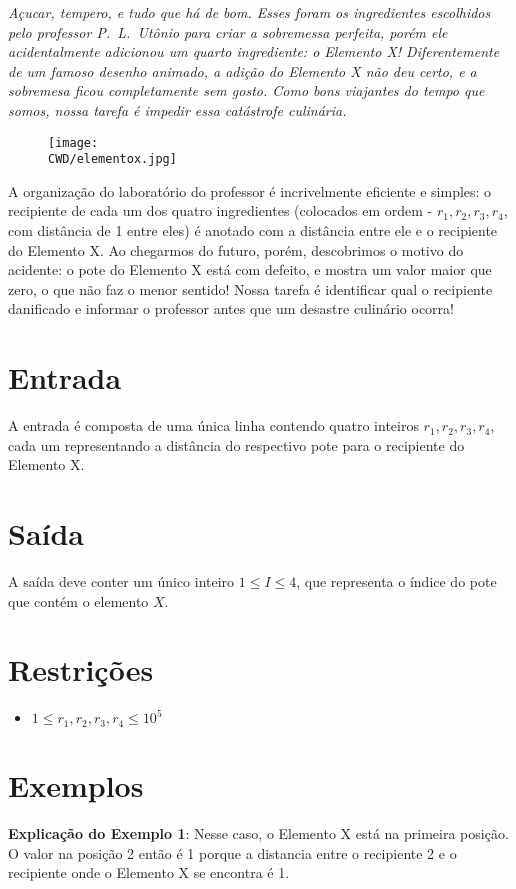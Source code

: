 \begin{center}
\textit{
	Açucar, tempero, e tudo que há de bom. Esses foram os ingredientes escolhidos pelo professor P.~L.~Utônio para criar a sobremessa perfeita,
	porém ele acidentalmente adicionou um quarto ingrediente: o Elemento X! Diferentemente de um famoso desenho animado, a adição do Elemento X não deu certo,
	e a sobremesa ficou completamente sem gosto. Como bons viajantes do tempo que somos, nossa tarefa é impedir essa catástrofe culinária.
  }
\end{center}



\begin{figure}[H]
    \centering
    \texttt{[image: \\CWD/elementox.jpg]}
\end{figure}

A organização do laboratório do professor é incrivelmente eficiente e simples: o recipiente de cada um dos quatro ingredientes (colocados em ordem - $r_1, r_2, r_3, r_4$, com distância de 1 entre eles)
é anotado com a distância entre ele e o recipiente do Elemento X. Ao chegarmos do futuro, porém, descobrimos o motivo do acidente:
o pote do Elemento X está com defeito, e mostra um valor maior que zero, o que não faz o menor sentido!
Nossa tarefa é identificar qual o recipiente danificado e informar o professor antes que um desastre culinário ocorra!

\section*{Entrada}

A entrada é composta de uma única linha contendo quatro inteiros $r_1, r_2, r_3, r_4$, cada um representando a distância do respectivo pote para o recipiente do Elemento X.

\section*{Saída}

A saída deve conter um único inteiro $1 \leq I \leq 4$, que representa o índice do pote que contém o elemento $X$.

\section*{Restrições}

\begin{itemize}
\item $ 1 \leq r_1, r_2, r_3, r_4 \leq 10^5$
\end{itemize}

\section*{Exemplos}

\exemplo

\bigskip
\textbf{Explicação do Exemplo 1}: Nesse caso, o Elemento X está na primeira posição. O valor na posição 2 então é 1 porque a distancia entre o recipiente 2 e o recipiente onde o Elemento X se encontra é 1.
